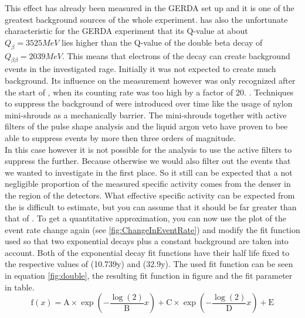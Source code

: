 This effect has already been measured in the GERDA set up and it is one of the greatest background sources of the whole experiment.
 has also the unfortunate characteristic for the GERDA experiment that its Q-value at about $Q_{\beta}=3525\unit{MeV}$ lies higher than the Q-value of the double beta decay of  $Q_{\beta \beta} = 2039\unit{MeV}$.
This means that electrons of the  decay can create background events in the investigated rage. 
Initially it was not expected to create much background.
Its influence on the measurement however was only recognized after the start of \PI, when its counting rate was too high by a factor of 20. \cite{becerici_schmidt_results_2014}. %
Techniques to suppress the background of  were introduced over time like the usage of nylon mini-shrouds as a mechanically barrier.
The mini-shrouds together with active filters of the pulse shape analysis and the liquid argon veto have proven to bee able to suppress  events by more then three orders of magnitude.
\\

In this case however it is not possible for the analysis to use the active filters to suppress the  further.
Because otherwise we would also filter out the \Kr events that we wanted to investigate in the first place.
So it still can be expected that a not negligible proportion of the measured specific activity comes from the denser  in the region of the detectors.
What effective specific activity can be expected from the  is difficult to estimate, but you can assume that it should be far greater than that of \Kr.
To get a quantitative approximation, you can now use the plot of the event rate change again (see \ref{fig:ChangeInEventRate}) and modify the fit function used so that two exponential decays plus a constant background are taken into account.
Both of the exponential decay fit functions have their half life fixed to the respective values of \Kr (10.739y) and  (32.9y).
The used fit function can be seen in equation \ref{fig:double}, the resulting fit function in figure and the fit parameter in table.
\begin{equation}
    \mathrm{f}(x) = \mathrm{A}\times\exp\left(-\frac{\log(2)}{\mathrm{B}} x \right) + \mathrm{C}\times\exp\left(-\frac{\log(2)}{\mathrm{D}} x \right) + \mathrm{E}
\end{equation}

